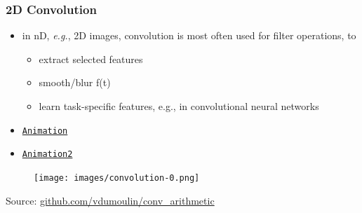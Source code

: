 






\begin{frame}
    \frametitle{2D Convolution}
    \begin{itemize}
    \item in nD, \emph{e.g.}, 2D images, convolution is most often used for filter operations, to
    \begin{itemize}
        \item extract selected features
        \item smooth/blur f(t) 
        \item learn task-specific features, e.g., in convolutional neural networks
    \end{itemize}
    \item \href{https://upload.wikimedia.org/wikipedia/commons/1/19/2D_Convolution_Animation.gif}{\texttt{Animation}}
    \item \href{https://github.com/vdumoulin/conv_arithmetic/blob/master/gif/full_padding_no_strides.gif}{\texttt{Animation2}}
    \end{itemize}
    \begin{figure}
        \texttt{[image: images/convolution-0.png]}
    \end{figure}
    \scriptsize Source: \href{https://github.com/vdumoulin/conv_arithmetic}{github.com/vdumoulin/conv\_arithmetic} $\quad$
\end{frame}




